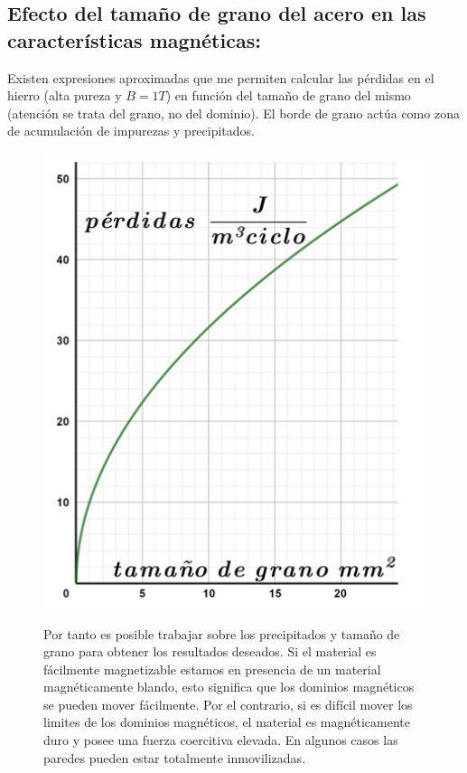 \subsection{Efecto del tamaño de grano del acero en las características magnéticas:}

	Existen expresiones aproximadas que me permiten calcular las pérdidas en el hierro (alta pureza y $B=1T$) en función del tamaño de grano del mismo (atención se trata del grano, no del dominio). El borde de grano actúa como zona de acumulación de impurezas y precipitados. 

\begin{figure}[H]
\begin{minipage}[b]{0.45\linewidth}
	\raggedright
    \includegraphics[width=1.0\textwidth]{./Figures/perdidasTamanhoGrano}
    \label{fig:perdidasTamanhoGrano}
\end{minipage}
\begin{minipage}[b]{0.50\textwidth}
	\vspace{0pt}
Por tanto es posible trabajar sobre los precipitados y tamaño de grano para obtener los resultados deseados. Si el material es fácilmente magnetizable estamos en presencia de un material magnéticamente blando, esto significa que los dominios magnéticos se pueden mover fácilmente. Por el contrario, si es difícil mover los limites de los dominios magnéticos, el material es magnéticamente duro y posee una fuerza coercitiva elevada. En algunos casos las paredes pueden estar totalmente inmovilizadas.

\vspace{1.2cm}
\end{minipage}
\end{figure}



